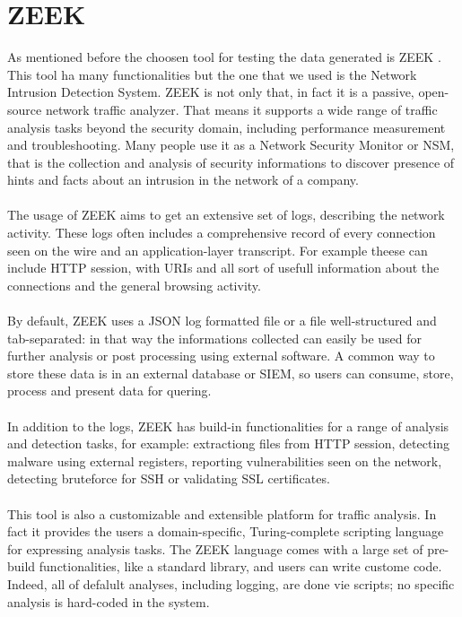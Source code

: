 \chapter{ZEEK}
As mentioned before the choosen tool for testing the data generated is ZEEK \cite{zeek}. This tool ha many functionalities
but the one that we used is the Network Intrusion Detection System.
ZEEK is not only that, in fact it is a passive, open-source network traffic analyzer. That means it supports
a wide range of traffic analysis tasks beyond the security domain, including performance measurement and 
troubleshooting. Many people use it as a Network Security Monitor or NSM, that is the collection and analysis
of security informations to discover presence of hints and facts about an intrusion in the network of a 
company.
\\\\
The usage of ZEEK aims to get an extensive set of logs, describing the network activity. These logs often 
includes a comprehensive record of every connection seen on the wire and an application-layer transcript. For
example theese can include HTTP session, with URIs and all sort of usefull information about the connections 
and the general browsing activity.
\\\\
By default, ZEEK uses a JSON log formatted file or a file well-structured and tab-separated: in that way the 
informations collected can easily be used for further analysis or post processing using external software.
A common way to store these data is in an external database or SIEM, so users can consume, store, process 
and present data for quering.
\\\\
In addition to the logs, ZEEK has build-in functionalities for a range of analysis and detection tasks, for
example: extractiong files from HTTP session, detecting malware using external registers, reporting 
vulnerabilities seen on the network, detecting bruteforce for SSH or validating SSL certificates.
\\\\
This tool is also a customizable and extensible platform for traffic analysis. In fact it provides the users 
a domain-specific, Turing-complete scripting language for expressing analysis tasks. The ZEEK language 
comes with a large set of pre-build functionalities, like a standard library, and users can write custome 
code. Indeed, all of defalult analyses, including logging, are done vie scripts; no specific analysis is 
hard-coded in the system.
